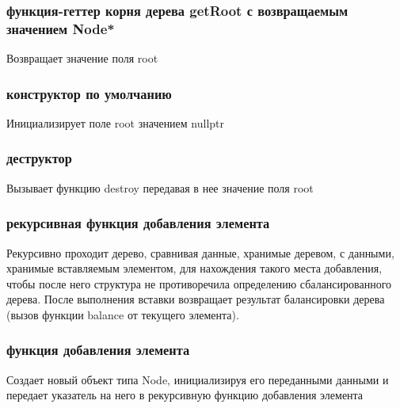 \documentclass[a4paper,12pt]{article}
\begin{document}
\begin{enumerate}
      \subsubsection{функция-геттер корня дерева getRoot с возвращаемым значением Node*}
      Возвращает значение поля root
      
      \subsubsection{конструктор по умолчанию}
      Инициализирует поле root значением nullptr
      
      \subsubsection{деструктор}
      Вызывает функцию destroy передавая в нее значение поля root
      
      \subsubsection{рекурсивная функция добавления элемента}
      Рекурсивно проходит дерево, сравнивая данные, хранимые деревом, с данными, хранимые вставляемым элементом, для нахождения такого места добавления, чтобы после него структура не противоречила определению сбалансированного дерева. После выполнения вставки возвращает результат балансировки дерева (вызов функции balance от текущего элемента).
      
      \subsubsection{функция добавления элемента}
      Создает новый объект типа Node, инициализируя его переданными данными и передает указатель на него в рекурсивную функцию добавления элемента
      

\end{enumerate}
\end{document}
